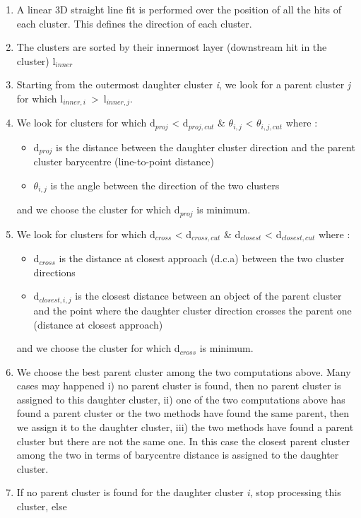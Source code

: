 \documentclass[cits]{JINST}
\begin{document}
\begin{enumerate}
  \item A linear 3D straight line fit is performed over the position of all the hits of each cluster. This defines the direction of each cluster.
  \item The clusters are sorted by their innermost layer (downstream hit in the cluster) l$_{inner}$
  \item Starting from the outermost daughter cluster \textit{i}, we look for a parent cluster \textit{j} for which l$_{inner,i}$~>~l$_{inner,j}$.
  \item We look for clusters for which d$_{proj}$ < d$_{proj,cut}$ \& $\theta_{i,j}$ < $\theta_{i,j,cut}$  where :
  \begin{itemize}
    \item d$_{proj}$ is the distance between the daughter cluster direction and the parent cluster barycentre (line-to-point distance)
    \item $\theta_{i,j}$ is the angle between the direction of the two clusters
  \end{itemize}
  and we choose the cluster for which d$_{proj}$ is minimum.  
  \item We look for clusters for which d$_{cross}$ < d$_{cross,cut}$ \& d$_{closest}$ < d$_{closest,cut}$ where :
  \begin{itemize}
    \item d$_{cross}$ is the distance at closest approach (d.c.a) between the two cluster directions
    \item d$_{closest,i,j}$ is the closest distance between an object of the parent cluster and the point where the daughter cluster direction crosses the parent one (distance at closest approach) 
  \end{itemize}
  and we choose the cluster for which d$_{cross}$ is minimum.
  \item We choose the best parent cluster among the two computations above. Many cases may happened i) no parent cluster is found, then no parent cluster is assigned to this daughter cluster, ii) one of the two computations above has found a parent cluster or the two methods have found the same parent, then we assign it to the daughter cluster, iii) the two methods have found a parent cluster but there are not the same one. In this case the closest parent cluster among the two in terms of barycentre distance is assigned to the daughter cluster.
  \item If no parent cluster is found for the daughter cluster \textit{i}, stop processing this cluster, else

\end{enumerate}
\end{document}
